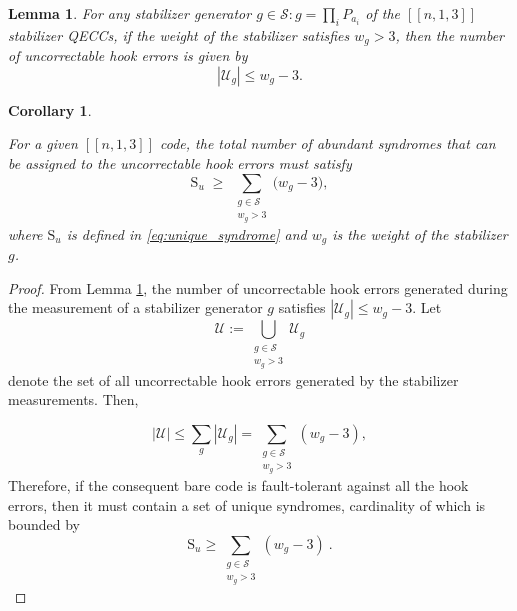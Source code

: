 \documentclass[10pt,a4paper]{amsart}
\newtheorem{lemma}{Lemma}
\newtheorem{corollary}{Corollary}
\begin{document}
\begin{lemma}
\label{lemma:one qubit error}
For any stabilizer generator $g \in \mathcal{S} : g= \prod_{i} P_{a_i}$ of the $[[n,1,3]]$ stabilizer QECCs, if the weight of the stabilizer satisfies $w_g > 3$, then the number of uncorrectable hook errors is given by
\begin{equation*}
|\mathcal{U}_g|\leq w_g-3.
\end{equation*}
\end{lemma}

\begin{corollary}
\label{corollary: 1}

For a given $[[n,1,3]]$ code, the total number of abundant syndromes that can be assigned to the uncorrectable hook errors must satisfy
\[
\mathrm{S}_u \;\ge\; \sum_{\substack{g \in \mathcal{S}\\ w_g > 3}} \big(w_g - 3\big),
\]
where $\mathrm{S}_{u}$ is defined in \eqref{eq:unique_syndrome} and $w_g$ is the weight of the stabilizer $g$.
\end{corollary}

\begin{proof}















From Lemma \ref{lemma:one qubit error}, the number of uncorrectable hook errors generated during the measurement of a stabilizer generator \(g\) satisfies
$|\mathcal{U}_g|\leq w_g-3 $.
Let $$\mathcal{U}
:=
\bigcup_{\substack{g\in\mathcal{S}\\ w_g>3}}
\mathcal{U}_g$$
denote the set of all uncorrectable hook errors generated by the
stabilizer measurements. Then,





\[
|\mathcal U| \le \sum_g|\mathcal U_g| = \sum_{\substack{g\in\mathcal S\\w_g>3}}(w_g-3),
\]
Therefore, if the consequent bare code is fault-tolerant against all the hook errors, then it must contain a set of unique syndromes, cardinality of which is bounded by
\[
\mathrm{S}_u \ge\sum_{\substack{g\in\mathcal S\\w_g>3}}(w_g-3)\ .
\]
\end{proof}
\end{document}
